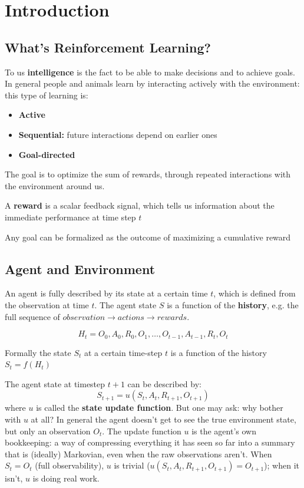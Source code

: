 \section{Introduction}
\subsection{What's Reinforcement Learning?}

To us \textbf{intelligence} is the fact to be able to make decisions and to achieve goals. In general people and animals learn by interacting actively with the environment: this type of learning is:
\begin{itemize}
    \item \textbf{Active}
    \item \textbf{Sequential:} future interactions depend on earlier ones
    \item \textbf{Goal-directed}
\end{itemize}


The goal is to optimize the sum of rewards, through repeated interactions with the environment around us.

\begin{definition}[Reward]
    A \textbf{reward} is a scalar feedback signal, which tells us information about the immediate performance at time step $t$
\end{definition}

\begin{definition}
    Any goal can be formalized as the outcome of maximizing a cumulative reward
\end{definition}

\subsection{Agent and Environment}
An agent is fully described by its state at a certain time $t$, which is defined from the observation at time $t$.  The agent state $S$ is a function of the \textbf{history}, e.g. the full sequence of $observation \to actions \to rewards$.

\[
    H_t = O_0, A_0, R_0, O_1, \dots, O_{t-1}, A_{t-1}, R_t, O_t
\]

Formally the state $S_t$ at a certain time-step $t$ is a function of the history $S_t = f(H_t)$

The agent state at timestep $t+1$ can be described by:
\[
    S_{t+1} = u(S_t, A_t, R_{t+1}, O_{t+1})
\]
where $u$ is called the \textbf{state update function}. But one may ask: why bother with $u$ at all? In general the agent doesn't get to see the true environment state, but only an observation $O_t$. The update function $u$ is the agent's own bookkeeping: a way of compressing everything it has seen so far into a summary that is (ideally) Markovian, even when the raw observations aren't. When $S_t = O_t$ (full observability), $u$ is trivial ($u(S_t, A_t, R_{t+1}, O_{t+1}) = O_{t+1}$); when it isn't, $u$ is doing real work.

